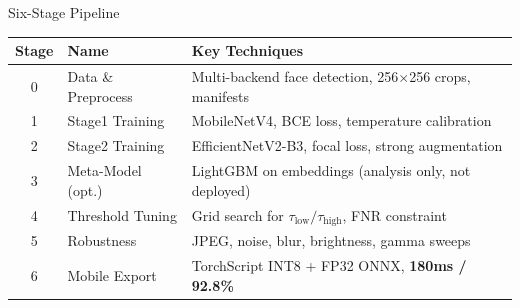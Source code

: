 \documentclass[aspectratio=169,12pt]{beamer}
\newcommand{\highlight}[1]{\textcolor{primaryblue}{\textbf{#1}}}
\begin{document}
\begin{frame}{Six-Stage Pipeline}
\begin{center}
\begin{tabular}{clp{10cm}}
\toprule
\textbf{Stage} & \textbf{Name} & \textbf{Key Techniques} \\
\midrule
0 & Data \& Preprocess & Multi-backend face detection, 256$\times$256 crops, manifests \\
1 & Stage1 Training & MobileNetV4, BCE loss, temperature calibration \\
2 & Stage2 Training & EfficientNetV2-B3, focal loss, strong augmentation \\
3 & Meta-Model (opt.) & LightGBM on embeddings (analysis only, not deployed) \\
4 & Threshold Tuning & Grid search for $\tau_{\text{low}}/\tau_{\text{high}}$, FNR constraint \\
5 & Robustness & JPEG, noise, blur, brightness, gamma sweeps \\
6 & Mobile Export & TorchScript INT8 + FP32 ONNX, \highlight{180ms / 92.8\%} \\
\bottomrule
\end{tabular}
\end{center}
\end{frame}
\end{document}
